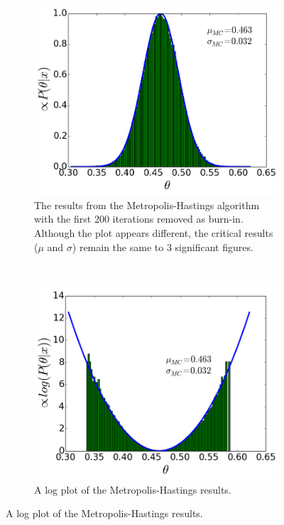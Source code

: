 \documentclass[a4paper,11pt,twoside]{article}
\begin{document}
\begin{figure}[ht]
	\centering
	\begin{subfigure}[t]{0.4\textwidth}
		\centering
		\includegraphics[width=\textwidth]{metropolishastings-burnin.png}
		\caption{The results from the Metropolis-Hastings algorithm
		with the first 200 iterations removed as burn-in. Although the
		plot appears different, the critical results ($\mu$ and $\sigma$)
	remain the same to 3 significant figures.}
		\label{fig:metropolisb}
	\end{subfigure}
	~
	\begin{subfigure}[t]{0.4\textwidth}
		\centering
		\includegraphics[width=\textwidth]{mhlog-burnin.png}
		\caption{A log plot of the Metropolis-Hastings results.}
		\label{fig:mhlogb}
	\end{subfigure}
	\label{fig:mhplotsb}
\end{figure}
\end{document}
